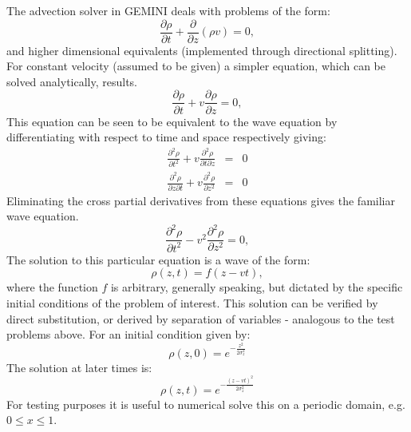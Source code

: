 \documentclass[11pt,letterpaper]{article}
\begin{document}
The advection solver in GEMINI deals with problems of the form:
\begin{equation}
\frac{\partial \rho}{\partial t} + \frac{\partial}{\partial z} \left( \rho v \right) = 0,  
\end{equation}
and higher dimensional equivalents (implemented through directional splitting).  For constant velocity (assumed to be given) a simpler equation, which can be solved analytically, results.  
\begin{equation}
\frac{\partial \rho}{\partial t} + v \frac{\partial \rho}{\partial z} = 0,  
\end{equation}
This equation can be seen to be equivalent to the wave equation by differentiating with respect to time and space respectively giving:  
\begin{eqnarray}
\frac{\partial^2 \rho}{\partial t^2} + v \frac{\partial^2 \rho}{\partial t \partial z} &=& 0 \\
\frac{\partial^2 \rho}{\partial z \partial t} + v \frac{\partial^2 \rho}{\partial z^2} &=& 0
\end{eqnarray}
Eliminating the cross partial derivatives from these equations gives the familiar wave equation.  
\begin{equation}
\frac{\partial^2 \rho}{\partial t^2} - v^2 \frac{\partial^2 \rho}{\partial z^2} = 0,  
\end{equation}
The solution to this particular equation is a wave of the form:
\begin{equation}
\rho(z,t)=f(z-vt),
\end{equation}
where the function $f$ is arbitrary, generally speaking, but dictated by the specific initial conditions of the problem of interest.  This solution can be verified by direct substitution, or derived by separation of variables - analogous to the test problems above.  For an initial condition given by:
\begin{equation}
\rho(z,0)=e^{-\frac{z^2}{2 \sigma_z^2}}
\end{equation}
The solution at later times is:
\begin{equation}
\rho(z,t)=e^{-\frac{(z-vt)^2}{2 \sigma_z^2}}
\end{equation}
For testing purposes it is useful to numerical solve this on a periodic domain, e.g. $0 \le x \le 1$.
\end{document}
